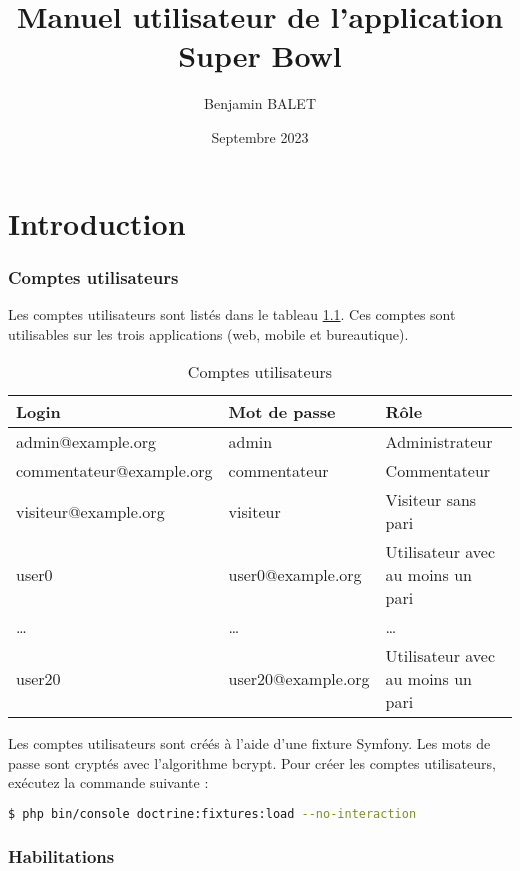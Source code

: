 \documentclass{book}
\title{Manuel utilisateur de l'application Super Bowl}
\author{Benjamin BALET}
\date{Septembre 2023}
\begin{document}
\maketitle{}
\tableofcontents
\newpage


\chapter{Introduction}
\subsection{Comptes utilisateurs}

Les comptes utilisateurs sont listés dans le tableau \ref{tab:table1}. Ces comptes sont utilisables sur les
trois applications (web, mobile et bureautique).

\begin{table}[H]
  \label{tab:table1}
    \begin{tabular}{l|l|l} \toprule
      \textbf{Login} & \textbf{Mot de passe} & \textbf{Rôle}\\ \hline
      admin@example.org & admin & Administrateur  \\ \hline
      commentateur@example.org & commentateur & Commentateur  \\ \hline
      visiteur@example.org & visiteur & Visiteur sans pari  \\ \hline
      user0 & user0@example.org  & Utilisateur avec au moins un pari  \\ \hline
      \ldots & \ldots  & \ldots  \\ \hline
      user20 & user20@example.org & Utilisateur avec au moins un pari  \\ \hline
    \end{tabular}
    \caption{Comptes utilisateurs}
\end{table}

Les comptes utilisateurs sont créés à l'aide d'une fixture Symfony. Les mots de passe sont cryptés avec 
l'algorithme bcrypt. Pour créer les comptes utilisateurs, exécutez la commande suivante :
\begin{lstlisting}[language=bash]
  $ php bin/console doctrine:fixtures:load --no-interaction
\end{lstlisting}


\subsection{Habilitations}
\end{document}
